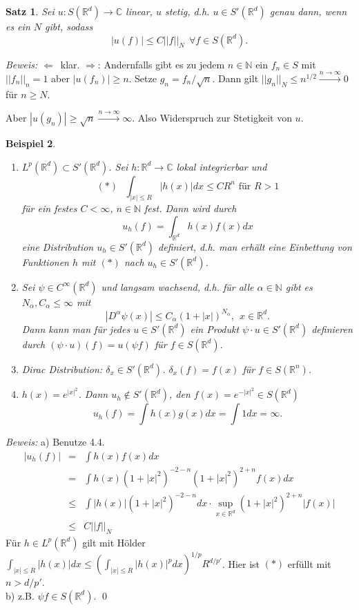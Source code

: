 \documentclass[12pt]{extreport} %
\newtheorem{Satz}{Satz}[subsection]
\newtheorem{Beispiel}[Satz]{Beispiel}
\numberwithin{equation}{section}
\newcommand{\C}{\mathbb{C}} %
\newcommand{\R}{\mathbb{R}} %
\newcommand{\N}{\mathbb{N}} %
\newcommand{\m}{\cdot}
\newcommand{\Bew}{\emph{Beweis: }}
\begin{document}
	\begin{Satz}
		Sei $u:S(\R^d)\rightarrow \C$ linear, $u$ stetig, d.h. $u\in S'(\R^d)$ genau dann, wenn es ein $N$ gibt, sodass 
		$$|u(f)|\leq C||f||_N~~\forall f\in S(\R^d).$$
	\end{Satz}
	
	\Bew \glqq$\Leftarrow$\grqq\ klar. \glqq$\Rightarrow$\grqq: Andernfalls gibt es zu jedem $n\in \N$ ein $f_n\in S$ mit $||f_n||_n = 1$ aber $|u(f_n)|\geq n$. Setze $g_n = f_n/\sqrt{n}$. Dann gilt $||g_n||_N \leq n^{1/2}\overset{n\rightarrow\infty}{\rightarrow} 0$ für $n\geq N$.
	
	Aber $|u(g_n)|\geq \sqrt{n}\overset{n\rightarrow\infty}{\rightarrow}\infty$. Also Widerspruch zur Stetigkeit von $u$.
	
	
	\begin{Beispiel}
		~
		\begin{enumerate}
			\item[a)] \glqq$L^p(\R^d)\subset S'(\R^d)$\grqq. Sei $h:\R^d\rightarrow \C$ lokal integrierbar und
			$$(*)~~~\int_{|x|\leq R}|h(x)|dx\leq C R^n\text{ für } R> 1$$
			für ein festes $C<\infty$, $n\in \N$ fest. Dann wird durch 
			$$u_h(f)= \int_{\R^d} h(x)f(x)dx$$
			eine Distribution $u_h\in S'(\R^d)$ definiert, d.h. man erhält eine Einbettung von Funktionen $h$ mit $(*)$ nach $u_h\in S'(\R^d)$.
			\item[b)] Sei $\psi\in C^\infty(\R^d)$ und langsam wachsend, d.h. für alle $\alpha\in \N$ gibt es $N_\alpha, C_\alpha\leq \infty$ mit 
			$$|D^\alpha\psi(x)|\leq C_\alpha(1+|x|)^{N_\alpha},~~ x\in \R^d.$$
			Dann kann man für jedes $u\in S'(\R^d)$ ein Produkt $\psi\m u\in S'(\R^d)$ definieren durch $(\psi\m u)(f) = u(\psi f)$ für $f\in S(\R^d)$.
			\item[c)] Dirac Distribution: $\delta_x\in S'(\R^d)$. $\delta_x(f) = f(x)$ für $f\in S(\R^n)$.
			\item[d)] $h(x) = e^{|x|^2}$. Dann $u_h\notin S'(\R^d)$, den $f(x) = e^{-|x|^2}\in S(\R^d)$
			$$u_h(f)=\int h(x) g(x) dx = \int 1 dx = \infty.$$
		\end{enumerate}
	\end{Beispiel}
	\Bew a) Benutze 4.4. 
	\begin{eqnarray}
		|u_h(f)| &=& \int h(x)f(x)dx\nonumber\\
		&=& \int h(x)(1+|x|^2)^{-2-n}(1+|x|^2)^{2+n}f(x) dx \nonumber\\
		&\leq& \int |h(x)|(1+|x|^2)^{-2-n}dx\m \sup_{x\in \R^d}(1+|x|^2)^{2+n}|f(x)|\nonumber\\
		&\leq& C||f||_N\nonumber
	\end{eqnarray}
	Für $h\in L^p(\R^d)$ gilt mit Hölder $\int_{|x|\leq R}|h(x)|dx\leq \left(\int_{|x|\leq R}|h(x)|^p dx \right)^{1/p} R^{d/p'}$. Hier ist $(*)$ erfüllt mit $n>d/p'$.\\
	b) z.B. $\psi f\in S(\R^d)$.
	\qed
	
\end{document}
